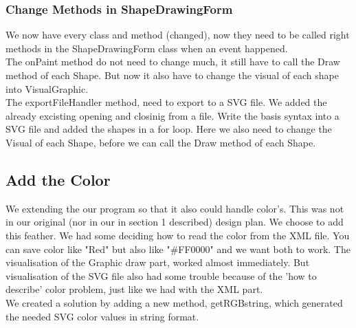 \documentclass[a4paper,12pt]{article}
\begin{document}
\subsubsection{Change Methods in ShapeDrawingForm}
We now have every class and method (changed), now they need to be called right methods in the ShapeDrawingForm class when an event happened. 
\\
The onPaint method do not need to change much, it still have to call the Draw method of each Shape. But now it also have to change the visual of each shape into VisualGraphic.
\\
The exportFileHandler method, need to export to a SVG file. We added the already excisting opening and closinig from a file. Write the basis syntax into a SVG file and added the shapes in a for loop. Here we also need to change the Visual of each Shape, before we can call the Draw method of each Shape.

\subsection{Add the Color}
We extending the our program so that it also could handle color's. This was not in our original (nor in our in section 1 described) design plan. We choose to add this feather. We had some deciding how to read the color from the XML file. You can save color like "Red" but also like "\#FF0000" and we want both to work. The visualisation of the Graphic draw part, worked almost immediately. But visualisation of the SVG file also had some trouble because of the 'how to describe' color problem, just like we had with the XML part.
\\
We created a solution by adding a new method, getRGBstring, which generated the needed SVG color values in string format. 

\end{document}
